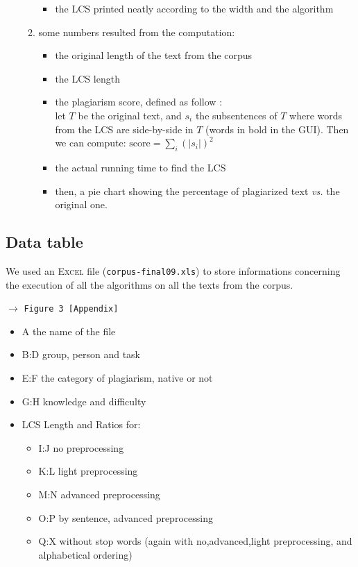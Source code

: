 \documentclass[a4paper,12pt]{article}
\newcommand{\see}[1]{\begin{flushright}$\rightarrow$ \texttt{#1 [Appendix]}\end{flushright}}
\newcommand{\tw}[1]{\texttt{#1}}
\newcommand{\sqbr}[1]{\lbrack#1\rbrack}
\newcommand{\seeFigure}[1]{\see{Figure #1}}
\begin{document}
\begin{enumerate}
\begin{enumerate}
\begin{itemize}
						\item the LCS printed neatly according to the width and the algorithm
					\end{itemize}
					\item some numbers resulted from the computation:
					\begin{itemize}
						\item the original length of the text from the corpus
						\item the LCS length
						\item the plagiarism score, defined as follow : \\
							let $T$ be the original text, and $s_i$ the subsentences of $T$ where words from the LCS are side-by-side in $T$ (words in bold in the GUI). Then we can compute:
							$\text{score} = \sum_{i}(|s_i|)^2$
						\item the actual running time to find the LCS
						\item then, a pie chart showing the percentage of plagiarized text \textit{vs.} the original one.
					\end{itemize}
				\end{enumerate}
			\end{enumerate}
		

		\subsection{Data table}
			We used an \textsc{Excel} file (\tw{corpus-final09.xls}) to store informations concerning the execution of all the algorithms on all the texts from the corpus.
			\seeFigure{3}
			\begin{itemize}
				\item \sqbr{A} the name of the file
				\item \sqbr{B:D} group, person and task
				\item \sqbr{E:F} the category of plagiarism, native or not
				\item \sqbr{G:H} knowledge and difficulty
				\item LCS Length and Ratios for:
				\begin{itemize}
					\item \sqbr{I:J} no preprocessing
					\item \sqbr{K:L} light preprocessing
					\item \sqbr{M:N} advanced preprocessing
					\item \sqbr{O:P} by sentence, advanced preprocessing
					\item \sqbr{Q:X} without stop words (again with no,advanced,light preprocessing, and alphabetical ordering)
				\end{itemize}
			\end{itemize}
\end{document}
